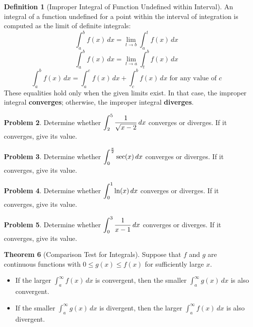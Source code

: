 \documentclass[letterpaper, twoside, 12pt]{book}
\theoremstyle{definition}
\newtheorem{theorem}{Theorem}
\theoremstyle{definition}
\newtheorem{definition}[theorem]{Definition}
\newtheorem{problem}[theorem]{Problem}
\newcommand{\ds}{\ensuremath{\displaystyle}}
\begin{document}
\vfill

\newpage

\begin{definition}[Improper Integral of Function Undefined within Interval]
  An integral of a function undefined for a point within the interval
  of integration is computed as the limit of definite integrals:
  \[
    \int_a^b f(x)\,dx = \lim_{t\to b} \int_a^t f(x)\,dx
  \]
  \[
    \int_a^b f(x)\,dx = \lim_{t\to a} \int_t^b f(x)\,dx
  \]
  \[
    \int_a^b f(x)\,dx
      =
    \int_a^c f(x)\,dx + \int_c^b f(x)\,dx
    \text{ for any value of } c
  \]
  These equalities hold only when the given limits exist. In that case, the
  improper integral \textbf{converges}; otherwise, the improper integral
  \textbf{diverges}.
\end{definition}

\begin{problem}
  Determine whether $\ds \int_2^5 \frac{1}{\sqrt{x-2}} \, dx$ converges or
  diverges. If it converges, give its value.
\end{problem}

\vfill

\begin{problem}
  Determine whether $\ds \int_0^{\frac{\pi}{2}} \sec(x) \, dx$ converges or
  diverges. If it converges, give its value.
\end{problem}

\vfill

\newpage

\begin{problem}
  Determine whether $\ds \int_0^1 \ln(x) \, dx$ converges or diverges.
  If it converges, give its value.
\end{problem}

\vfill

\begin{problem}
  Determine whether $\ds \int_0^3 \frac{1}{x-1} \, dx$ converges or diverges.
  If it converges, give its value.
\end{problem}

\vfill

\newpage

\begin{theorem}[Comparison Test for Integrals]
  Suppose that $f$ and $g$ are continuous functions with
  $0 \leq g(x) \leq f(x)$ for sufficiently large $x$.
  \begin{itemize}
    \item If the larger $\int_a^\infty f(x) \, dx$ is convergent,
          then the smaller $\int_a^\infty g(x) \, dx$ is also convergent.
    \item If the smaller $\int_a^\infty g(x) \, dx$ is divergent,
          then the larger $\int_a^\infty f(x) \, dx$ is also divergent.
  \end{itemize}
\end{theorem}
\end{document}
